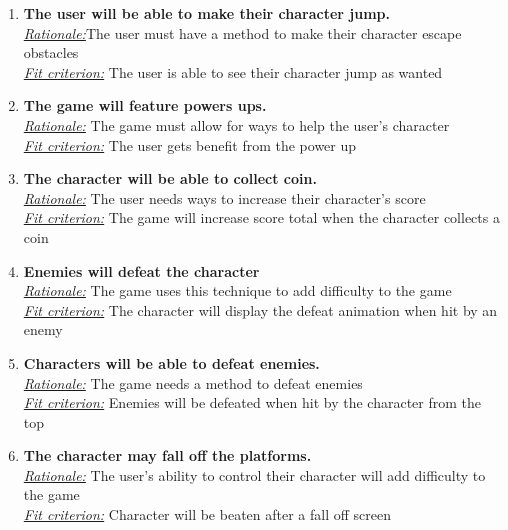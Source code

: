 \documentclass[12pt, titlepage]{article}
\begin{document}
\begin{enumerate}
\item \textbf{The user will be able to make their character jump.} \\
\underline{\textit{Rationale:}}The user must have a method to make their character escape obstacles\\
\underline{\textit{Fit criterion:}} The user is able to see their character jump as wanted\\

\item \textbf{The game will feature powers ups.}\\
\underline{\textit{Rationale:}} The game must allow for ways to help the user's character\\
\underline{\textit{Fit criterion:}} The user gets benefit from the power up\\

\item \textbf{The character will be able to collect coin.}\\
\underline{\textit{Rationale:}} The user needs ways to increase their character's score\\
\underline{\textit{Fit criterion:}} The game will increase score total when the character collects a coin  \\

\item \textbf{Enemies will defeat the character}\\
\underline{\textit{Rationale:}} The game uses this technique to add difficulty to the game\\
\underline{\textit{Fit criterion:}} The character will display the defeat animation when hit by an enemy\\

\item \textbf{Characters will be able to defeat enemies.}\\
\underline{\textit{Rationale:}} The game needs a method to defeat enemies\\
\underline{\textit{Fit criterion:}} Enemies will be defeated when hit by the character from the top\\

\item \textbf{The character may fall off the platforms.} \\
\underline{\textit{Rationale:}} The user's ability to control their character will add difficulty to the game\\
\underline{\textit{Fit criterion:}} Character will be beaten after a fall off screen\\


\end{enumerate}
\end{document}
